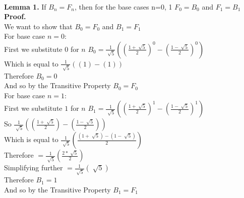 \documentclass{article}
\begin{document}
\\
{\bf Lemma 1.} 
If $B_n=F_n$, then for the base cases n=0, 1 $F_0=B_0$ and $F_1=B_1$  
\\
{\bf Proof.}
\\
	We want to show that $B_0=F_0$ and $B_1=F_1$
	\\
	For base case $n=0$:
	\\
	First we substitute $0$ for $n$ $B_0=\frac{1}{\sqrt[]{5}}((\frac{1+\sqrt[]{5}}{2})^0-(\frac{1-\sqrt[]{5}}{2})^0)$
	\\
	Which is equal to $\frac{1}{\sqrt[]{5}}((1)-(1))$
	\\
	Therefore $B_0=0$
	\\
	And so by the Transitive Property $B_0=F_0$
	\\
	For base case $n=1$:
	\\
	First we substitute $1$ for $n$ $B_1=\frac{1}{\sqrt[]{5}}((\frac{1+\sqrt[]{5}}{2})^1-(\frac{1-\sqrt[]{5}}{2})^1)$
	\\
	So $\frac{1}{\sqrt[]{5}}((\frac{1+\sqrt[]{5}}{2})-(\frac{1-\sqrt[]{5}}{2}))$
	\\
	Which is equal to $\frac{1}{\sqrt[]{5}}(\frac{(1+\sqrt[]{5})-(1-\sqrt[]{5})}{2})$
	\\
	Therefore $=\frac{1}{\sqrt[]{5}}(\frac{2*\sqrt[]{5}}{2})$
	\\
	Simplifying further $=\frac{1}{\sqrt[]{5}}(\sqrt[]{5})$
	\\
	Therefore $B_1=1$ 
	\\
	And so by the Transitive Property $B_1=F_1$
\end{document}
